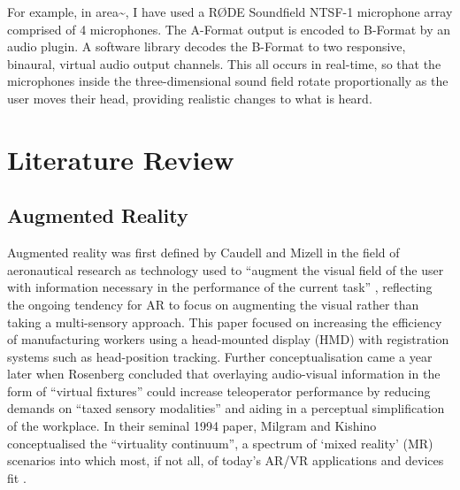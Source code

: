 For example, in area\textasciitilde{}, I have used a RØDE Soundfield NTSF-1 microphone array comprised of 4 microphones. The A-Format output is encoded to B-Format by an audio plugin. A software library decodes the B-Format to two responsive, binaural, virtual audio output channels. This all occurs in real-time, so that the microphones inside the three-dimensional sound field rotate proportionally as the user moves their head, providing realistic changes to what is heard.


\section{Literature Review}                     \label{sec: area-literature}
\subsection{Augmented Reality}                  \label{sec: area-literature-ar}
Augmented reality was first defined by Caudell and Mizell in the field of aeronautical research as technology used to “augment the visual field of the user with information necessary in the performance of the current task” \citeyearpar{caudell1992}, reflecting the ongoing tendency for AR to focus on augmenting the visual rather than taking a multi-sensory approach. This paper focused on increasing the efficiency of manufacturing workers using a head-mounted display (HMD) with registration systems such as head-position tracking. Further conceptualisation came a year later when Rosenberg \citeyearpar{rosenberg1993} concluded that overlaying audio-visual information in the form of “virtual fixtures” could increase teleoperator performance by reducing demands on “taxed sensory modalities” and aiding in a perceptual simplification of the workplace. In their seminal 1994 paper, Milgram and Kishino conceptualised the “virtuality continuum”, a spectrum of ‘mixed reality' (MR) scenarios into which most, if not all, of today’s AR/VR applications and devices fit \citeyearpar{milgram1994}.

